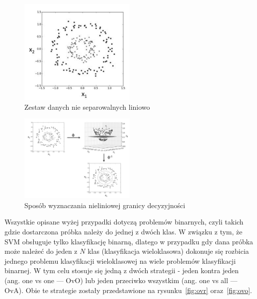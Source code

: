 \begin{figure}[]
    \centering
    \includegraphics[width=0.5\textwidth]{images/dane_nie_separowalne_liniowo}
    \caption{  Zestaw danych nie separowalnych liniowo }
    \label{fig:dane_nie_separowalne_liniowo}
\end{figure}

\begin{figure}[]
    \centering
    \includegraphics[width=0.5\textwidth]{images/wyniki_mapowan}
    \caption{ Sposób wyznaczania nieliniowej granicy decyzyjności }
    \label{fig:wyniki_mapowan}
\end{figure}

\bigskip

Wszystkie opisane wyżej przypadki dotyczą problemów binarnych,
czyli takich gdzie dostarczona próbka należy do jednej z dwóch klas.
W związku z tym, że SVM obsługuje tylko klasyfikację binarną, dlatego w przypadku
gdy dana próbka może należeć do jeden z $N$ klas (klasyfikacja wieloklasowa)
dokonuje się rozbicia jednego problemu klasyfikacji wieloklasowej na wiele problemów klasyfikacji binarnej.
W tym celu stosuje się jedną z dwóch strategii - jeden kontra jeden (ang. one vs one --- OvO)
lub jeden przeciwko wszystkim (ang. one vs all --- OvA).
Obie te strategie zostały przedstawione na rysunku~\ref{fig:ovr} oraz~\ref{fig:ovo}.


